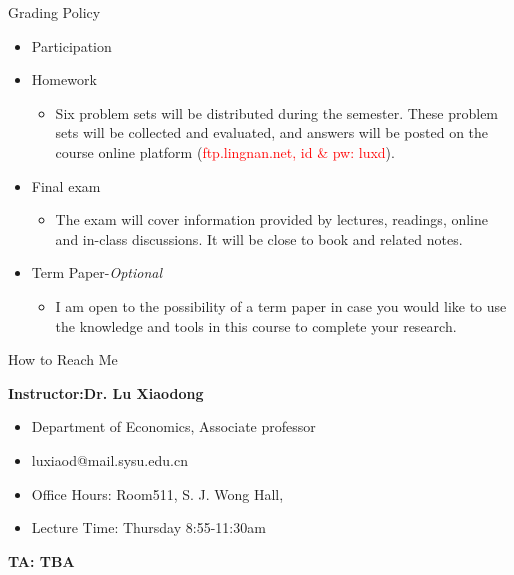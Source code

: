 \documentclass[10pt,hyperref={CJKbookmarks=true},xcolor=dvipsnames,aspectratio=169]{beamer}
\begin{document}
\begin{frame}{Grading Policy}

\begin{itemize}
\item Participation \structure{\textcolor{red}{10\%}}
\item Homework \structure{\textcolor{red}{20\%}}

\begin{itemize}
\item Six problem sets will be distributed during the semester. These problem
sets will be collected and evaluated, and answers will be posted on
the course online platform (\textcolor{red}{ftp.lingnan.net, id \&
pw: luxd}).
\end{itemize}
\item Final exam \structure{\textcolor{red}{70\%}}

\begin{itemize}
\item The exam will cover information provided by lectures, readings, online
and in-class discussions. It will be close to book and related notes. 
\end{itemize}
\item Term Paper-\emph{Optional}

\begin{itemize}
\item I am open to the possibility of a term paper in case you would like
to use the knowledge and tools in this course to complete your research.
\end{itemize}
\end{itemize}
\end{frame}

\begin{frame}{How to Reach Me}


\textbf{Instructor:Dr. Lu Xiaodong}
\begin{itemize}
\item Department of Economics, Associate professor
\item luxiaod@mail.sysu.edu.cn 
\item Office Hours: Room511, S. J. Wong Hall, 
\item Lecture Time: Thursday 8:55-11:30am
\end{itemize}


\textbf{TA: TBA}
\end{frame}
\end{document}

